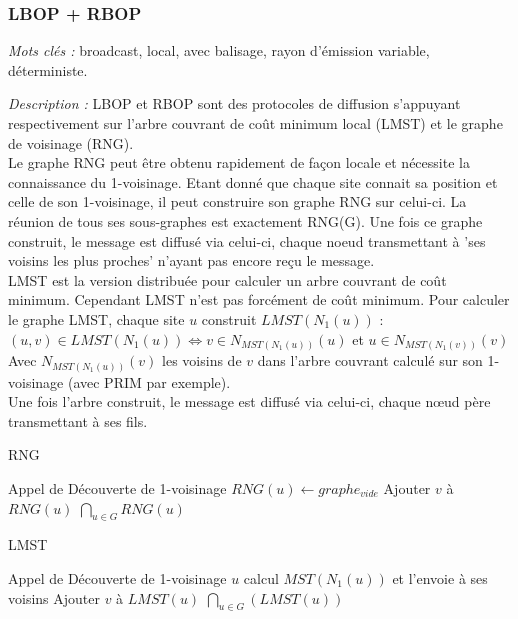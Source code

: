 \subsubsection{LBOP + RBOP}

\emph{Mots clés :} broadcast, local, avec balisage, rayon d'émission variable, déterministe.

\emph{Description :} LBOP et RBOP sont des protocoles de diffusion s'appuyant respectivement sur l'arbre couvrant de coût minimum local (LMST) et le graphe de voisinage (RNG).\\
Le graphe RNG peut être obtenu rapidement de façon locale et nécessite la connaissance du 1-voisinage. Etant donné que chaque site connait sa position et celle de son 1-voisinage, il peut construire son graphe RNG sur celui-ci. La réunion de tous ses sous-graphes est exactement RNG(G). Une fois ce graphe construit, le message est diffusé via celui-ci, chaque noeud  transmettant à 'ses voisins les plus proches' n'ayant pas encore reçu le message.\\



LMST est la version distribuée pour calculer un arbre couvrant de coût minimum. Cependant LMST n'est pas forcément de coût minimum. Pour calculer le graphe LMST, chaque site $u$ construit $LMST(N_1(u))$ : \\
 $(u,v) \in LMST(N_1(u)) \Leftrightarrow v \in N_{MST(N_1(u))}(u)$ et $ u \in N_{MST(N_1(v))}(v)$\\
Avec $N_{MST(N_1(u))}(v)$ les voisins de $v$ dans l'arbre couvrant calculé sur son 1-voisinage (avec PRIM par exemple).\\
Une fois l'arbre construit, le message est diffusé via celui-ci, chaque nœud père transmettant à ses fils.




\begin{algorithm}[h]
\caption{RNG}
\label{RNG}
\begin{algorithmic}
	\STATE Appel de Découverte de 1-voisinage
\ENDFOR
{}
	\STATE  $RNG(u) \leftarrow graphe_{vide}$
	    \STATE Ajouter $v$ à $RNG(u)$
	  \ENDIF
        \ENDFOR
\ENDFOR
\RETURN $\bigcap_{u \in G} RNG(u)$
\end{algorithmic}
\end{algorithm}

\begin{algorithm}[h]
\caption{LMST}
\label{LMST}
\begin{algorithmic}
	\STATE Appel de Découverte de 1-voisinage
	\STATE $u$ calcul $MST(N_1(u))$ et l'envoie à ses voisins
\ENDFOR
{}
	    \STATE Ajouter $v$ à $LMST(u)$
	  \ENDIF
        \ENDFOR
\ENDFOR
\RETURN $\bigcap_{u \in G}( LMST(u))$
\end{algorithmic}
\end{algorithm}


